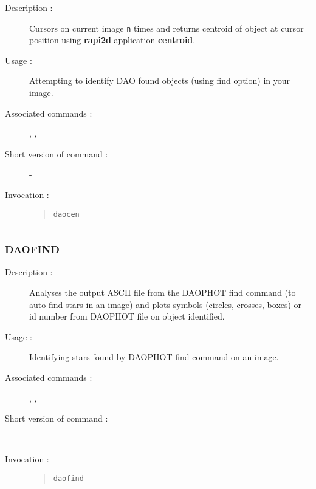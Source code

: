 \begin{description}

\item[Description :] Cursors on current image {\tt n} times and returns
centroid of object at cursor position using {\bf rapi2d} application
{\bf centroid}.

\item[Usage :] Attempting to identify DAO found objects (using find
option) in your image.

\item[Associated commands :] {\tt {}}, 
{\tt {}}, {\tt {}}

\item[Short version of command :] -

\item[Invocation :]

\begin{quote}{\tt  daocen }\end{quote}

\end{description}

\hrule 
\subsubsection*{\label{DAOFIND}DAOFIND}

\begin{description}

\item[Description :] Analyses the output ASCII file from the DAOPHOT
find command (to auto-find stars in an image) and plots symbols
(circles, crosses, boxes) or id number from DAOPHOT file on object
identified.

\item[Usage :] Identifying stars found by DAOPHOT find command on an image.  

\item[Associated commands :] {\tt {}}, 
{\tt {}}, {\tt {}}

\item[Short version of command :] -

\item[Invocation :]

\begin{quote}{\tt  daofind }\end{quote}

\end{description}

